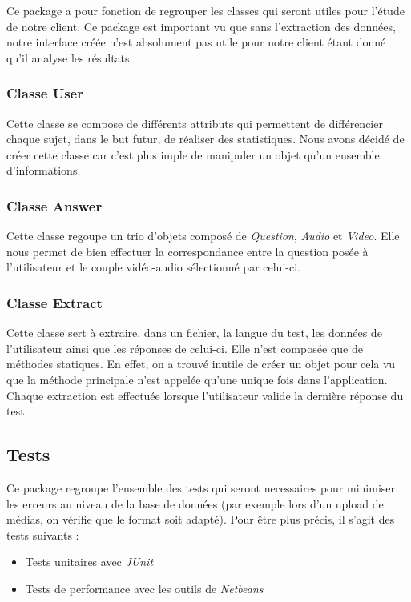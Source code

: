 Ce package a pour fonction de regrouper les classes qui seront utiles pour l'étude de notre client. Ce package est important vu que sans l'extraction des données, notre interface créée n'est absolument pas utile pour notre client étant donné qu'il analyse les résultats.

\subsubsection{Classe User}

Cette classe se compose de différents attributs qui permettent de différencier chaque sujet, dans le but futur, de réaliser des statistiques. Nous avons décidé de créer cette classe car c'est plus imple de manipuler un objet qu'un ensemble d'informations.

\subsubsection{Classe Answer}

Cette classe regoupe un trio d'objets composé de \textit{Question}, \textit{Audio} et \textit{Video}. Elle nous permet de bien effectuer la correspondance entre la question posée à l'utilisateur et le couple vidéo-audio sélectionné par celui-ci.

\subsubsection{Classe Extract}

Cette classe sert à extraire, dans un fichier, la langue du test, les données de l'utilisateur ainsi que les réponses de celui-ci. Elle n'est composée que de méthodes statiques. En effet, on a trouvé inutile de créer un objet pour cela vu que la méthode principale n'est appelée qu'une unique fois dans l'application. Chaque extraction est effectuée lorsque l'utilisateur valide la dernière réponse du test.

\subsection{Tests}

Ce package regroupe l'ensemble des tests qui seront necessaires pour minimiser les erreurs au niveau de la base de données (par exemple lors d'un upload de médias, on vérifie que le format soit adapté). Pour être plus précis, il s'agit des tests suivants :
\begin{itemize}
 \item Tests unitaires avec \textit{JUnit}
 \item Tests de performance avec les outils de \textit{Netbeans}
\end{itemize}


